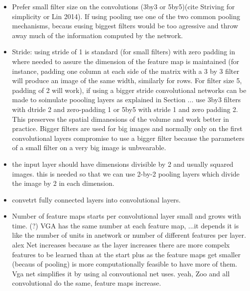 \begin{itemize}
	\item Prefer small filter size on the convolutions (3by3 or 5by5)(cite Striving for simplicity or Lin 2014). If using pooling use one of the two common pooling mechanisms, becaus eusing biggest filters would be too agressive and throw away much of the information computed by the network.
	\item Stride: using stride of 1 is standard (for small filters) with zero padding in where needed to assure the dimension of the feature map is maintained (for instance, padding one column at each side of the matrix with a 3 by 3 filter will produce an image of the same width, similarly for rows. For filter size 5, padding of 2 will work), if using a bigger stride convolutional networks can be made to soimulate poooling layers as explained in Section ...
	use 3by3 filters with dtride 2 and zero-padding 1 or 5by5 with stride 1  and zero padding 2. This preserves the spatial dimanesions of the volume and work better in practice. Bigger filters are used for big images and normally only on the first convolutional layers compromise to use a bigger filter because the parameters of a small filter on a very big image is unbvearable. 

	\item the input layer should have dimensions divisible by 2 and usually squared images. this is needed so that we can use 2-by-2 pooling layers which divide the image by 2 in each dimension.

	\item convetrt fully connected layers into convolutional layers.

	\item Number of feature maps starts per convolutional layer small and grows with time. (?) VGA has the same number at each feature map, ...it depends it is like the number of units in anetwork or number of different features per layer. alex Net increases because as the layer increases there are more compelx features to be learned than at the start plus  as the feature maps get smaller (becaus of pooling) is more computationally feasible to have more of them. Vga net simplifies it by using al convoutional net uses. 
	yeah, Zoo and all convolutional do the same, feature maps increase. 


\end{itemize}
